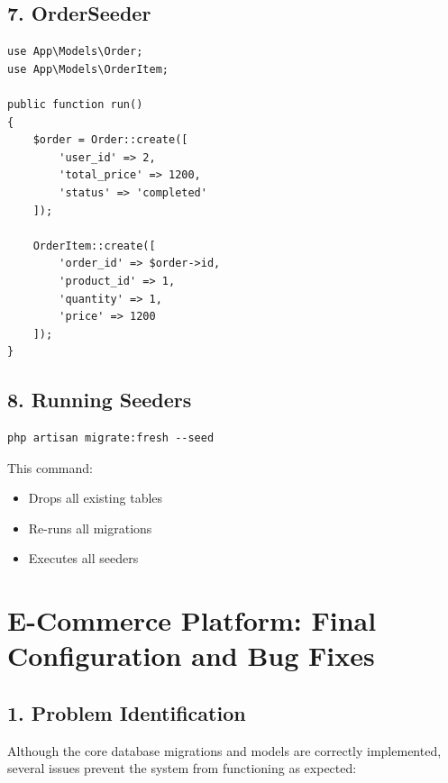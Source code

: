 \documentclass[12pt,a4paper]{article}
\begin{document}
\subsection{7. OrderSeeder}

\begin{verbatim}
use App\Models\Order;
use App\Models\OrderItem;

public function run()
{
    $order = Order::create([
        'user_id' => 2,
        'total_price' => 1200,
        'status' => 'completed'
    ]);

    OrderItem::create([
        'order_id' => $order->id,
        'product_id' => 1,
        'quantity' => 1,
        'price' => 1200
    ]);
}
\end{verbatim}

\subsection{8. Running Seeders}

\begin{verbatim}
php artisan migrate:fresh --seed
\end{verbatim}

This command:
\begin{itemize}[noitemsep]
    \item Drops all existing tables
    \item Re-runs all migrations
    \item Executes all seeders
\end{itemize}




\section{E-Commerce Platform: Final Configuration and Bug Fixes}

\subsection{1. Problem Identification}

Although the core database migrations and models are correctly implemented, several issues prevent the system from functioning as expected:
\end{document}
